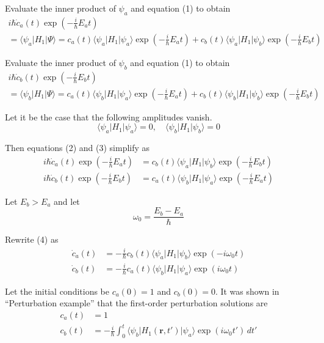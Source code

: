 Evaluate the inner product of $\psi_a$ and equation (1) to obtain
\begin{multline*}
i\hbar\dot c_a(t)\exp\left(-\tfrac{i}{\hbar}E_at\right)
\\
=\langle\psi_a|H_1|\Psi\rangle
=c_a(t)\langle\psi_a|H_1|\psi_a\rangle\exp\left(-\tfrac{i}{\hbar}E_at\right)
+c_b(t)\langle\psi_a|H_1|\psi_b\rangle\exp\left(-\tfrac{i}{\hbar}E_bt\right)
\tag{2}
\end{multline*}

Evaluate the inner product of $\psi_b$ and equation (1) to obtain
\begin{multline*}
i\hbar\dot c_b(t)\exp\left(-\tfrac{i}{\hbar}E_bt\right)
\\
=\langle\psi_b|H_1|\Psi\rangle
=c_a(t)\langle\psi_b|H_1|\psi_a\rangle\exp\left(-\tfrac{i}{\hbar}E_at\right)
+c_b(t)\langle\psi_b|H_1|\psi_b\rangle\exp\left(-\tfrac{i}{\hbar}E_bt\right)
\tag{3}
\end{multline*}

Let it be the case that the following amplitudes vanish.
\begin{equation*}
\langle\psi_a|H_1|\psi_a\rangle=0,\quad \langle\psi_b|H_1|\psi_b\rangle=0
\end{equation*}

Then equations (2) and (3) simplify as
\begin{equation*}
\begin{aligned}
i\hbar\dot c_a(t)\exp\left(-\tfrac{i}{\hbar}E_at\right)
&=c_b(t)\langle\psi_a|H_1|\psi_b\rangle\exp\left(-\tfrac{i}{\hbar}E_bt\right)
\\
i\hbar\dot c_b(t)\exp\left(-\tfrac{i}{\hbar}E_bt\right)
&=c_a(t)\langle\psi_b|H_1|\psi_a\rangle\exp\left(-\tfrac{i}{\hbar}E_at\right)
\end{aligned}
\tag{4}
\end{equation*}

Let $E_b>E_a$ and let
\begin{equation*}
\omega_0=\frac{E_b-E_a}{\hbar}
\end{equation*}

Rewrite (4) as
\begin{align*}
\dot c_a(t)&=-\frac{i}{\hbar}c_b(t)\langle\psi_a|H_1|\psi_b\rangle\exp(-i\omega_0t)
\\
\dot c_b(t)&=-\frac{i}{\hbar}c_a(t)\langle\psi_b|H_1|\psi_a\rangle\exp(i\omega_0t)
\end{align*}

Let the initial conditions be $c_a(0)=1$ and $c_b(0)=0$.
It was shown in ``Perturbation example'' that the first-order perturbation solutions are
\begin{align*}
c_a(t)&=1
\\
c_b(t)&=-\frac{i}{\hbar}\int_0^t
\langle\psi_b|H_1(\mathbf r,t')|\psi_a\rangle\exp(i\omega_0t')\,dt'
\end{align*}



